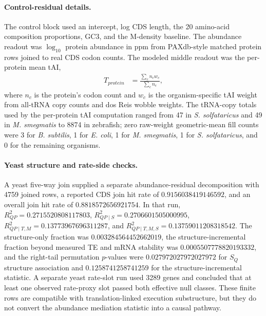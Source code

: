 \paragraph{Control-residual details.}
The control block used an intercept, log CDS length, the 20 amino-acid composition proportions, GC3, and the M-density baseline.  The abundance readout was $\log_{10}$ protein abundance in ppm from PAXdb-style matched protein rows joined to real CDS codon counts.  The modeled middle readout was the per-protein mean tAI,
$$
\begin{aligned}
T_{protein} &= \frac{\sum_c n_c w_c}{\sum_c n_c},
\end{aligned}
$$
where $n_c$ is the protein's codon count and $w_c$ is the organism-specific tAI weight from all-tRNA copy counts and dos Reis wobble weights.  The tRNA-copy totals used by the per-protein tAI computation ranged from 47 in \emph{S. solfataricus} and 49 in \emph{M. smegmatis} to 8874 in zebrafish; zero raw-weight geometric-mean fill counts were 3 for \emph{B. subtilis}, 1 for \emph{E. coli}, 1 for \emph{M. smegmatis}, 1 for \emph{S. solfataricus}, and 0 for the remaining organisms.

\paragraph{Yeast structure and rate-side checks.}
A yeast five-way join supplied a separate abundance-residual decomposition with 4759 joined rows, a reported CDS join hit rate of $0.9156038419146592$, and an overall join hit rate of $0.8818572656921754$.  In that run, $R^2_{QP}=0.2715520808117803$, $R^2_{QP\mid S}=0.2706601505000995$, $R^2_{QP\mid T,M}=0.13773967696311287$, and $R^2_{QP\mid T,M,S}=0.13759011208318542$.  The structure-only fraction was $0.003284564452662019$, the structure-incremental fraction beyond measured TE and mRNA stability was $0.0005507778820193332$, and the right-tail permutation $p$-values were $0.027972027972027972$ for $S_Q$ structure association and $0.1258741258741259$ for the structure-incremental statistic.  A separate yeast rate-slot run used 3289 genes and concluded that at least one observed rate-proxy slot passed both effective null classes.  These finite rows are compatible with translation-linked execution substructure, but they do not convert the abundance mediation statistic into a causal pathway.

